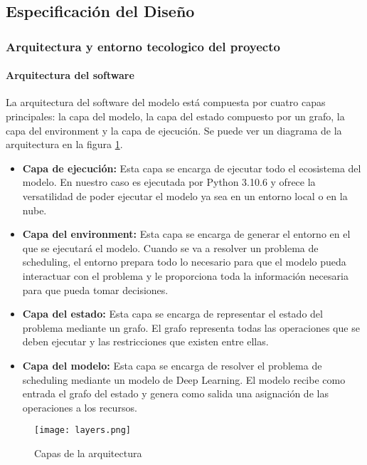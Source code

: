\subsection{Especificación del Diseño}
\subsubsection{Arquitectura y entorno tecologico del proyecto}
\paragraph{Arquitectura del software}
La arquitectura del software del modelo está compuesta por cuatro capas principales: 
la capa del modelo, la capa del estado compuesto por un grafo, la capa del 
environment y la capa de ejecución. Se puede ver un diagrama de la arquitectura en la
figura \ref{fig:layers}. \medskip

\begin{itemize}
    \item \textbf{Capa de ejecución:} Esta capa se encarga de ejecutar todo el ecosistema
    del modelo. En nuestro caso es ejecutada por Python 3.10.6 y ofrece la versatilidad de
    poder ejecutar el modelo ya sea en un entorno local o en la nube. 
    \item \textbf{Capa del environment:} Esta capa se encarga de generar el entorno en el que se
    ejecutará el modelo. Cuando se va a resolver un problema de scheduling, el entorno
    prepara todo lo necesario para que el modelo pueda interactuar con el problema y le
    proporciona toda la información necesaria para que pueda tomar decisiones.
    \item \textbf{Capa del estado:} Esta capa se encarga de representar el estado del problema
    mediante un grafo. El grafo representa todas las operaciones que se deben ejecutar y
    las restricciones que existen entre ellas.
    \item \textbf{Capa del modelo:} Esta capa se encarga de resolver el problema de scheduling
    mediante un modelo de Deep Learning. El modelo recibe como entrada el grafo del
    estado y genera como salida una asignación de las operaciones a los recursos. 
\end{itemize}

\begin{figure}[ht]
    \centering
    \texttt{[image: layers.png]}
    \caption{Capas de la arquitectura}
    \label{fig:layers}
\end{figure}


